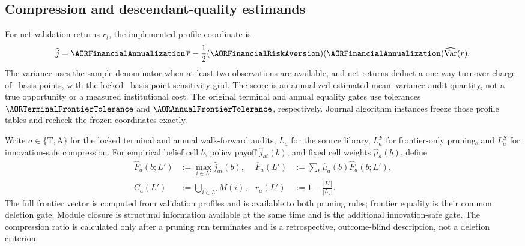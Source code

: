 \subsection{Compression and descendant-quality estimands}
\label{sec:supp-financial-estimands}

For net validation returns \(r_t\), the implemented profile coordinate is
\[
 \widehat j=\AORFinancialAnnualization\,\overline r
 -\frac12(\AORFinancialRiskAversion)(\AORFinancialAnnualization)
  \widehat{\operatorname{Var}}(r).
\]
The variance uses the sample denominator when at least two observations are
available, and net returns deduct a one-way turnover charge of
\AORFinancialPrimaryCostBps\ basis points, with the locked
\AORFinancialSensitivityBps\ basis-point sensitivity grid. The score is an
annualized estimated mean--variance audit quantity, not a true opportunity or
a measured institutional cost. The original terminal and annual equality gates
use tolerances \(\AORTerminalFrontierTolerance\) and
\(\AORAnnualFrontierTolerance\), respectively. Journal algorithm instances
freeze those profile tables and recheck the frozen coordinates exactly.

Write \(a\in\{\mathrm{T},\mathrm{A}\}\) for the locked terminal and annual
walk-forward audits, \(L_a\) for the source library, \(L_a^F\) for
frontier-only pruning, and \(L_a^S\) for innovation-safe compression.  For
empirical belief cell \(b\), policy payoff \(\widehat j_{ai}(b)\), and fixed
cell weights \(\widehat\mu_a(b)\), define
\begin{align}
  \widehat F_a(b;L')
    &:=\max_{i\in L'}\widehat j_{ai}(b),&
  \overline F_a(L')
    &:=\sum_b\widehat\mu_a(b)\widehat F_a(b;L'),
    \label{eq:supp-financial-frontier}\\
  C_a(L')
    &:=\bigcup_{i\in L'}M(i),&
  r_a(L')
    &:=1-\frac{|L'|}{|L_a|}.
    \label{eq:supp-financial-closure-reduction}
\end{align}
The full frontier vector is computed from validation profiles and is available
to both pruning rules; frontier equality is their common deletion gate.
Module closure is structural information available at the same time and is
the additional innovation-safe gate.  The compression ratio is calculated
only after a pruning run terminates and is a retrospective, outcome-blind
description, not a deletion criterion.

